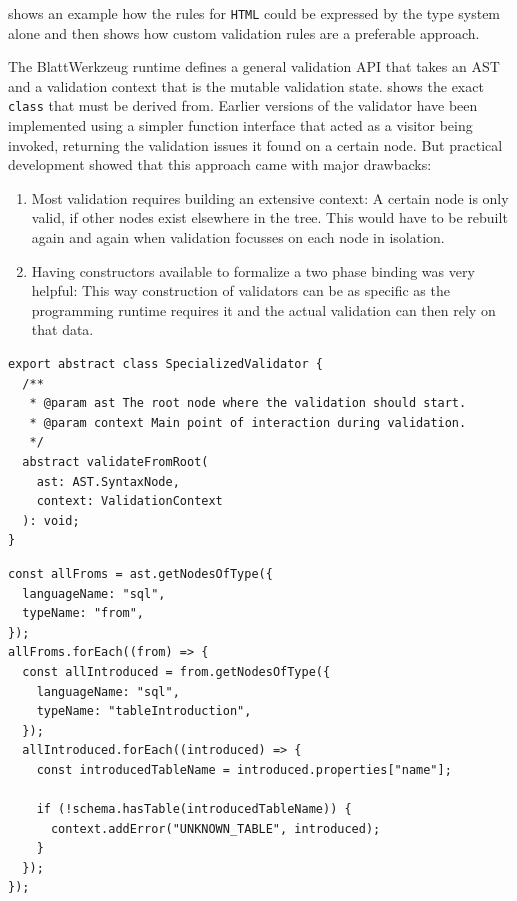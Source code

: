 \documentclass[]{report}
\begin{document}
 shows an example how the rules for \texttt{HTML} could be expressed by the type system alone and then shows how custom validation rules are a preferable approach.

The Blatt\-Werkzeug runtime defines a general validation API that takes an AST and a validation context that is the mutable validation state.  shows the exact \texttt{class} that must be derived from. Earlier versions of the validator have been implemented using a simpler function interface that acted as a visitor being invoked, returning the validation issues it found on a certain node. But practical development showed that this approach came with major drawbacks:

\begin{enumerate}
\item Most validation requires building an extensive context: A certain node is only valid, if other nodes exist elsewhere in the tree. This would have to be rebuilt again and again when validation focusses on each node in isolation.
\item Having constructors available to formalize a two phase binding was very helpful: This way construction of validators can be as specific as the programming runtime requires it and the actual validation can then rely on that data.
\end{enumerate}

\begin{listing}[p]
\begin{verbatim}
export abstract class SpecializedValidator {
  /**
   * @param ast The root node where the validation should start.
   * @param context Main point of interaction during validation.
   */
  abstract validateFromRoot(
    ast: AST.SyntaxNode,
    context: ValidationContext
  ): void;
}
\end{verbatim}
\caption{API to be implemented for a validator}
\label{lst:typescript-specializedvalidator}
\end{listing}

\begin{listing}[p]
\begin{verbatim}
const allFroms = ast.getNodesOfType({
  languageName: "sql",
  typeName: "from",
});
allFroms.forEach((from) => {
  const allIntroduced = from.getNodesOfType({
    languageName: "sql",
    typeName: "tableIntroduction",
  });
  allIntroduced.forEach((introduced) => {
    const introducedTableName = introduced.properties["name"];

    if (!schema.hasTable(introducedTableName)) {
      context.addError("UNKNOWN_TABLE", introduced);
    }
  });
});
\end{verbatim}
\caption{Validation example for \texttt{SQL}: Ensuring that each table introduced exists in the schema }
\label{lst:sql-validator-table-names}
\end{listing}
\end{document}
